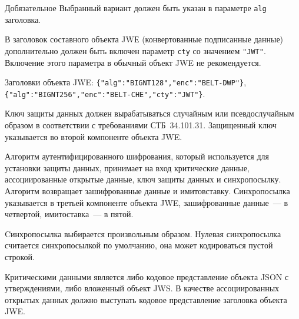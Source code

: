 \begin{appendix}{Д}{обязательное}{}
Выбранный вариант должен быть указан в параметре \lstinline{alg} заголовка. 

В заголовок составного объекта JWЕ (конвертованные подписанные данные) 
дополнительно должен быть включен параметр \lstinline{cty} со значением 
\lstinline{"JWT"}. 
%
Включение этого параметра в обычный объект JWE не рекомендуется.

\begin{example*}
Заголовки объекта JWE: 
\lstinline|{"alg":"BIGNT128","enc":"BELT-DWP"}|,
\lstinline|{"alg":"BIGNT256","enc":"BELT-CHE","cty":"JWT"}|.
\end{example*}

Ключ защиты данных должен вырабатываться случайным или псевдослучайным образом 
в соответствии с требованиями СТБ~34.101.31.
%
Защищенный ключ указывается во второй компоненте объекта JWE.

Алгоритм аутентифицированного шифрования, который используется для установки 
защиты данных, принимает на вход критические данные, ассоциированные открытые 
данные, ключ защиты данных и синхропосылку. Алгоритм возвращает зашифрованные 
данные и имитовставку.
%
Синхропосылка указывается в третьей компоненте объекта JWE, зашифрованные 
данные~--- в четвертой, имитоставка~--- в пятой.

Cинхропосылка выбирается произвольным образом.
%
Нулевая синхропосылка считается синхропосылкой по умолчанию, она может 
кодироваться пустой строкой.

Критическими данными является либо кодовое представление объекта JSON с 
утверждениями, либо вложенный объект JWS. 
%
В качестве ассоциированных открытых данных должно выступать кодовое 
представление заголовка объекта JWE.

\end{appendix}
